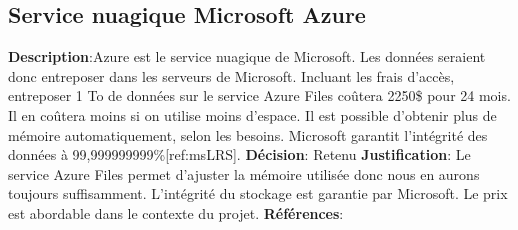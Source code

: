 

\subsection{Service nuagique Microsoft Azure}
\label{s:archiver_conc3}

\textbf{Description}:Azure est le service nuagique de Microsoft. Les données seraient donc entreposer dans les serveurs de Microsoft. Incluant les frais d’accès, entreposer 1 To de données sur le service Azure Files coûtera 2250\$ pour 24 mois. Il en coûtera moins si on utilise moins d’espace. Il est possible d’obtenir plus de mémoire automatiquement, selon les besoins. Microsoft garantit l’intégrité des données à 99,999999999\%[ref:msLRS].
\textbf{Décision}: Retenu 
\textbf{Justification}: Le service Azure Files permet d’ajuster la mémoire utilisée donc nous en aurons toujours suffisamment. L’intégrité du stockage est garantie par Microsoft. Le prix est abordable dans le contexte du projet.
\textbf{Références}: 
\cite{msAzFile, msRedunLRS}
